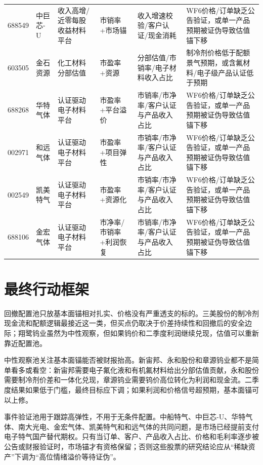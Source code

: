 \begin{exhibitbox}[方法与失效条件桥]
{\begin{tabular}{llllll}
688549 & 中巨芯-U & 收入高增/近零每股收益材料平台 & 市销率+市场锚 & 收入增速校验/客户认证/现金消耗 & WF6价格/订单缺乏公告验证，或单一产品预期被证伪导致估值锚下移 \\
603505 & 金石资源 & 化工材料分部估值 & 市盈率+资源 & 分部估值/市销率/电子材料收入占比 & 制冷剂价格低于配额景气预期，或含氟材料/电子级产品认证低于预期 \\
688268 & 华特气体 & 认证驱动电子材料平台 & 市盈率+平台溢价 & 市销率/市净率/客户认证与产品收入占比 & WF6价格/订单缺乏公告验证，或单一产品预期被证伪导致估值锚下移 \\
002971 & 和远气体 & 认证驱动电子材料平台 & 市盈率+项目弹性 & 市销率/市净率/客户认证与产品收入占比 & WF6价格/订单缺乏公告验证，或单一产品预期被证伪导致估值锚下移 \\
002549 & 凯美特气 & 认证驱动电子材料平台 & 市盈率+资源化 & 市销率/市净率/客户认证与产品收入占比 & WF6价格/订单缺乏公告验证，或单一产品预期被证伪导致估值锚下移 \\
688106 & 金宏气体 & 认证驱动电子材料平台 & 市净率/市销率+利润恢复 & 市销率/市净率/客户认证与产品收入占比 & WF6价格/订单缺乏公告验证，或单一产品预期被证伪导致估值锚下移 \\
\bottomrule
\end{tabular}
}
\end{exhibitbox}

\section{最终行动框架}
回撤配置池只放基本面锚相对扎实、价格没有严重透支的标的。三美股份的制冷剂现金流和配额逻辑最接近这一类，但买点仍取决于价差持续性和回撤后的安全边际；翔鹭钨业虽然为中性观察，但如果钨价和二季度利润继续兑现，估值可以重新靠近配置池。

中性观察池关注基本面锚能否被财报抬高。新宙邦、永和股份和章源钨业都不是简单看多或看空：新宙邦需要电子氟化液和有机氟材料给出分部估值贡献，永和股份需要制冷剂价差和一体化兑现，章源钨业需要钨价高位转化为利润和现金流。二季度结果如果低于门槛，最终目标应下调；如果利润和价格信号超预期，基本面锚可以上修。

事件验证池用于跟踪高弹性，不用于无条件配置。中船特气、中巨芯-U、华特气体、南大光电、金宏气体、凯美特气和和远气体的共同问题，是市场已经提前支付电子特气国产替代期权。只有当订单、客户、产品收入占比、价格和毛利率逐步被公告或财报验证时，市场锚才有资格保留；否则这些股票的研究结论应从“稀缺资产”下调为“高位情绪溢价等待证伪”。
